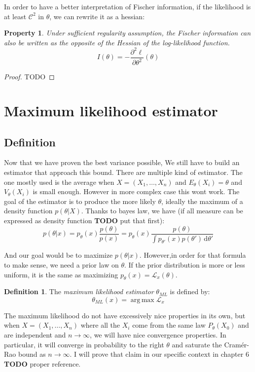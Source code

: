 \documentclass[10pt]{report}
\theoremstyle{plain}
\newtheorem{prop}[thm]{Property}
\theoremstyle{definition}
\newtheorem{defn}{Definition}[chapter]
\theoremstyle{remark}
\newcommand{\dd}{\mathrm{d}}
\DeclareMathOperator{\argmax}{arg\,max}
\newcommand{\class}[1]{{\mathscr{C}^{#1}}}
\newcommand{\ml}{_{M\!L}}
\begin{document}
In order to have a better interpretation of Fischer information, if the
likelihood is at least $\class 2$ in $\theta$, we can rewrite
it as a hessian:

\begin{prop}
  Under sufficient regularity assumption,
  the Fischer information can also be written as the opposite of the Hessian of the
  log-likelihood function.
  \[I(\theta) = -\frac{\partial^2 \ell}{\partial \theta^2}(\theta)\]
\end{prop}

\begin{proof}
  TODO
\end{proof}







\section{Maximum likelihood estimator}

\subsection{Definition}

Now that we have proven the best variance possible, We still have to build an
estimator that approach this bound. There are multiple kind of estimator. The
one mostly used is the average when $X = (X_1,\ldots,X_n)$ and
$E_\theta(X_i) = \theta$ and $V_\theta(X_i)$ is small enough. However in more
complex case this wont work. The goal of the estimator is to produce the more
likely $\theta$, ideally the maximum of a density function $p(\theta | X)$.
Thanks to bayes law, we have (if all measure can be expressed as density
function \textbf{TODO} put that first):
\[p(\theta|x) = p_\theta(x) \frac {p(\theta)}{p(x)}
  = p_\theta(x) \frac {p(\theta)}{\int p_{\theta'}(x)p(\theta')\,\dd \theta'}\]

And our goal would be to maximize $p(\theta|x)$. However,in order for that
formula to make sense, we need a prior law on $\theta$. If the prior
distribution is more or less uniform, it is the same as maximizing $p_\theta(x)
= \mathcal{L}_x(\theta)$.


\begin{defn}
  The \emph{maximum likelihood estimator} $\theta\ml$ is defined by:
  \[\theta\ml(x) = \argmax \mathcal{L}_x\]
\end{defn}

The maximum likelihood do not have excessively nice properties in its own, but
when $X = (X_1,\ldots,X_n)$ where all the $X_i$ come from the same law
$P_\theta(X_0)$ and are independent and $n \to \infty$,
we will have nice convergence properties. In particular, it will converge in
probability to the right
$\theta$ and saturate the Cramér-Rao bound as $n \to \infty$. I will prove that
claim in our specific context in chapter 6 \textbf{TODO} proper reference.
\end{document}
